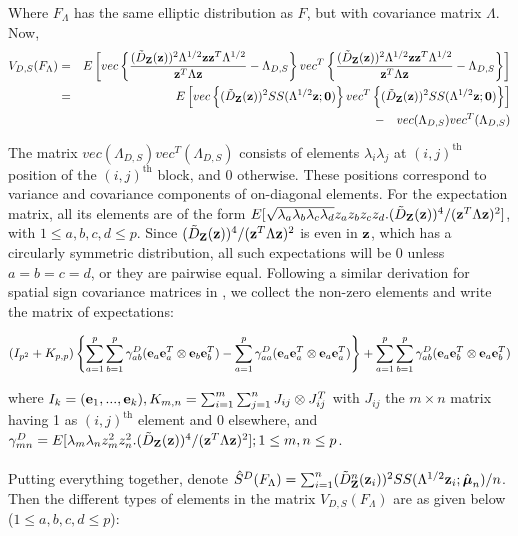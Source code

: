 \documentclass[fleqn,11pt]{article}
\begin{document}
Where $F_\Lambda$ has the same elliptic distribution as $F$, but with covariance matrix $\Lambda$. Now,
\begin{eqnarray*}
V_{D,S} (F_\Lambda) &=& E \left[ vec \left\{ \frac{(\tilde D_{\mathbf{Z}} ({\bf{z}}))^2 \Lambda^{1/2} {\bf{z}}{\bf{z}}^T \Lambda^{1/2}}{{\bf{z}}^T\Lambda{\bf{z}}} - \Lambda_{D,S} \right\} vec^T \left\{ \frac{(\tilde D_{\mathbf{Z}} ({\bf{z}}))^2 \Lambda^{1/2} {\bf{z}}{\bf{z}}^T \Lambda^{1/2}}{{\bf{z}}^T\Lambda{\bf{z}}} - \Lambda_{D,S} \right\} \right]\\
&=& E \left[ vec \left\{ (\tilde D_{\mathbf{Z}} ({\bf{z}}))^2 SS(\Lambda^{1/2}{\bf{z}}; \bf0) \right\} vec^T \left\{ (\tilde D_{\mathbf{Z}} ({\bf{z}}))^2 SS(\Lambda^{1/2}{\bf{z}}; \bf0) \right\} \right]\\
&& - \quad vec(\Lambda_{D,S}) vec^T(\Lambda_{D,S})
\end{eqnarray*}

The matrix $vec(\Lambda_{D,S}) vec^T(\Lambda_{D,S})$ consists of elements $\lambda_i\lambda_j$ at $(i,j)^\text{th}$ position of the $(i,j)^\text{th}$ block, and 0 otherwise. These positions correspond to variance and covariance components of on-diagonal elements. For the expectation matrix, all its elements are of the form $E[\sqrt{\lambda_a \lambda_b \lambda_c \lambda_d} z_a z_b z_c z_d . (\tilde D_{\mathbf{Z}} ({\bf{z}}))^4 / ({\bf{z}}^T \Lambda {\bf{z}})^2]$, with $1 \leq a,b,c,d \leq p$. Since $(\tilde D_{\mathbf{Z}} ({\bf{z}}))^4 / ({\bf{z}}^T \Lambda {\bf{z}})^2$ is even in ${\bf{z}}$, which has a circularly symmetric distribution, all such expectations will be 0 unless $a=b=c=d$, or they are pairwise equal. Following a similar derivation for spatial sign covariance matrices in \cite{magyar14}, we collect the non-zero elements and write the matrix of expectations:

$$ (I_{p^2} + K_{p,p}) \left\{ \sum_{a=1}^p \sum_{b=1}^p \gamma^D_{ab} ({\bf{e}}_a {\bf{e}}_a^T \otimes  {\bf{e}}_b {\bf{e}}_b^T) - \sum_{a=1}^p \gamma^D_{aa} ({\bf{e}}_a {\bf{e}}_a^T \otimes  {\bf{e}}_a {\bf{e}}_a^T) \right\} + \sum_{a=1}^p \sum_{b=1}^p \gamma^D_{ab} ({\bf{e}}_a {\bf{e}}_b^T \otimes  {\bf{e}}_a {\bf{e}}_b^T) $$

where $I_k = ({\bf{e}}_1,...,{\bf{e}}_k), K_{m,n} = \sum_{i=1}^m \sum_{j=1}^n J_{ij} \otimes J_{ij}^T$ with $J_{ij}$ the $m \times n$ matrix having 1 as $(i,j)^\text{th}$ element and 0 elsewhere, and $\gamma^D_{mn} = E[ \lambda_m \lambda_n z_m^2 z_n ^2 . (\tilde D_{\mathbf{Z}} ({\bf{z}}))^4 / ({\bf{z}}^T \Lambda {\bf{z}})^2]; 1 \leq m,n \leq p$.

\paragraph{}Putting everything together, denote $\hat S^D(F_\Lambda) = \sum_{i=1}^n (\tilde D^n_{\mathbf{Z}} ({\bf{z}}_i))^2 SS(\Lambda^{1/2}{\bf{z}}_i; \hat {{\boldsymbol{\mu}}}_n)/n $. Then the different types of elements in the matrix $V_{D,S}(F_\Lambda)$ are as given below ($1 \leq a,b,c,d \leq p$):
\end{document}

